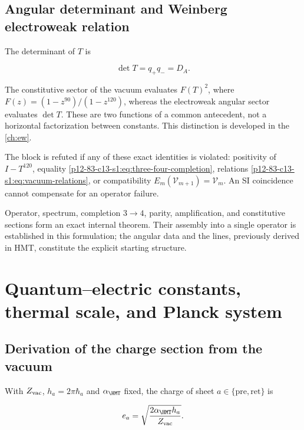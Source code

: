 \subsection{Angular determinant and Weinberg electroweak relation}

The determinant of \(T\) is

\begin{equation}
\det T=q_+q_-=D_A.
\label{p12-83-c13-s1:eq:detT}
\end{equation}

The constitutive sector of the vacuum evaluates \(F(T)^2\), where
\(F(z)=(1-z^{90})/(1-z^{120})\), whereas the electroweak angular
sector evaluates \(\det T\). These are two functions of a
common antecedent, not a horizontal factorization between constants.
This distinction is developed in the \cref{ch:ew}.

\begin{falsifier}
The block is refuted if any of these exact identities is violated:
positivity of \(I-T^{120}\), equality
\cref{p12-83-c13-s1:eq:three-four-completion}, relations \cref{p12-83-c13-s1:eq:vacuum-relations}, or
compatibility \(E_m(\mathcal V_{m+1})=\mathcal V_m\). An SI coincidence
cannot compensate for an operator failure.
\end{falsifier}

\begin{statusbox}
Operator, spectrum, completion \(3\to4\), parity, amplification, and constitutive sections form an exact internal theorem. Their assembly into a single operator is established in this formulation; the angular data and the lines, previously derived in HMT, constitute the explicit starting structure.
\end{statusbox}


\section{Quantum--electric constants, thermal scale, and Planck system}
\label{p12-83-c13-s2:ch:metrology}

\subsection{Derivation of the charge section from the vacuum}

With \(Z_{\rm vac}\), \(h_a=2\pi\hbar_a\) and \(\alpha_{\HMT}\) fixed, the charge of sheet \(a\in\{\mathrm{pre},\mathrm{ret}\}\) is

\begin{equation}
e_a=\sqrt{\frac{2\alpha_{\HMT}h_a}{Z_{\rm vac}}}.
\label{p12-83-c13-s2:eq:charge}
\end{equation}

